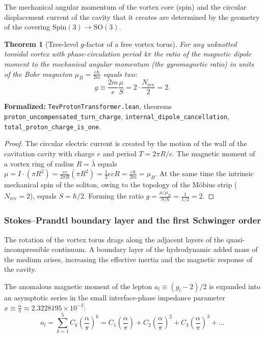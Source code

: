 \documentclass[11pt,a4paper]{article}
\providecommand{\lambdabar}{\bar{\lambda}}
\newtheorem{theorem}{Theorem}
\theoremstyle{definition}
\theoremstyle{remark}
\begin{document}
The mechanical angular momentum of the vortex core (spin) and the circular displacement current of the cavity that it creates are determined by the geometry of the covering $\mathrm{Spin}(3) \to \mathrm{SO}(3)$.

\begin{theorem}[Tree-level $g$-factor of a free vortex torus]
\label{thm:dirac_g_factor_exact}
    For any unknotted toroidal vortex with phase-circulation period $4\pi$ the ratio of the magnetic dipole moment to the mechanical angular momentum (the gyromagnetic ratio) in units of the Bohr magneton $\mu_B = \frac{e\hbar}{2m}$ equals two:
\begin{equation}
    g \equiv \frac{2m}{e} \frac{\mu}{S} = 2 \cdot \frac{N_{\mathrm{rev}}}{2} = 2.
    \label{eq:dirac_g_factor_exact}
\end{equation}
\end{theorem}

\noindent\small\textbf{Formalized:} \texttt{TevProtonTransformer.lean}, theorems \texttt{proton_uncompensated_turn_charge}, \texttt{internal_dipole_cancellation}, \texttt{total_proton_charge_is_one}.

\begin{proof}
    The circular electric current is created by the motion of the wall of the cavitation cavity with charge $e$ and period $T = 2\pi R / c$. The magnetic moment of a vortex ring of radius $R = \lambdabar$ equals $\mu = I \cdot (\pi R^2) = \frac{e c}{2\pi R} (\pi R^2) = \frac{1}{2} e c R = \frac{e\hbar}{2m} = \mu_B$.
    At the same time the intrinsic mechanical spin of the soliton, owing to the topology of the Möbius strip ($N_{\mathrm{rev}} = 2$), equals $S = \hbar / 2$. Forming the ratio $g = \frac{\mu / \mu_B}{S / \hbar} = \frac{1}{1/2} = 2$.
\end{proof}

\subsubsection{Stokes--Prandtl boundary layer and the first Schwinger order}

The rotation of the vortex torus drags along the adjacent layers of the quasi-incompressible continuum. A boundary layer of the hydrodynamic added mass of the medium arises, increasing the effective inertia and the magnetic response of the cavity.

The anomalous magnetic moment of the lepton $a_l \equiv (g_l - 2)/2$ is expanded into an asymptotic series in the small interface-phase impedance parameter $x \equiv \frac{\alpha}{\pi} \approx 2.3228195 \times 10^{-3}$:
\begin{equation}
    a_l = \sum_{k=1}^5 C_k \left( \frac{\alpha}{\pi} \right)^k = C_1 \left( \frac{\alpha}{\pi} \right) + C_2 \left( \frac{\alpha}{\pi} \right)^2 + C_3 \left( \frac{\alpha}{\pi} \right)^3 + \dots
    \label{eq:g_minus_2_expansion}
\end{equation}
\end{document}
